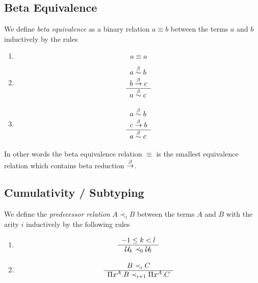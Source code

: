 \subsection{Beta Equivalence}


\begin{definition}
    We define \emph{beta equivalence} as a binary relation $a \equiv b$ between
    the terms $a$ and $b$ inductively by the rules
    \begin{enumerate}
    \item
        $$ a \equiv a$$

    \item
        $$
        \begin{array}{l} 
            a \stackrel{\beta}{\sim} b
            \\
            b \stackrel{\beta}{\to} c
         \\ \hline 
            a \stackrel{\beta}{\sim} c
        \end{array}
        $$

    \item
        $$
        \begin{array}{l} 
            a \stackrel{\beta}{\sim} b
            \\
            c \stackrel{\beta}{\to} b
         \\ \hline 
            a \stackrel{\beta}{\sim} c
        \end{array}
        $$
    \end{enumerate}

    In other words the beta equivalence relation $\equiv$ is the smallest
    equivalence relation which contains beta reduction $\stackrel{\beta}{\to}$.
\end{definition}








\subsection{Cumulativity / Subtyping}



\begin{definition}
    We define the
    \emph{predecessor relation}
    $A \prec_i B$ between the terms $A$
    and $B$ with the arity $i$ inductively by the following rules
    \begin{enumerate}
    \item
        $$
        \begin{array}{c} 
            -1 \le k < l
         \\ \hline 
            {\cal U}_k \prec_0 {\cal U}_l
        \end{array}
        $$

    \item
        $$
        \begin{array}{c} 
            B \prec_i C
         \\ \hline 
            \Pi x^A. B \prec_{i+1} \Pi x^A. C
        \end{array}
        $$
    \end{enumerate}
\end{definition}




